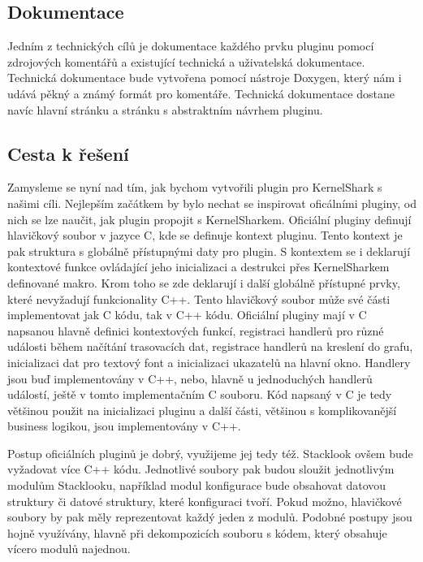 \subsection*{Dokumentace}

Jedním z technických cílů je dokumentace každého prvku pluginu pomocí zdrojových komentářů a existující technická a uživatelská dokumentace. Technická dokumentace bude vytvořena pomocí nástroje Doxygen, který nám i udává pěkný a známý formát pro komentáře. Technická dokumentace dostane navíc hlavní stránku a stránku s abstraktním návrhem pluginu.

\subsection*{Cesta k řešení}

Zamysleme se nyní nad tím, jak bychom vytvořili plugin pro KernelShark s našimi cíli. Nejlepším začátkem by bylo nechat se inspirovat oficálními pluginy, od nich se lze naučit, jak plugin propojit s KernelSharkem. Oficiální pluginy definují hlavičkový soubor v jazyce C, kde se definuje kontext pluginu. Tento kontext je pak struktura s globálně přístupnými daty pro plugin. S kontextem se i deklarují kontextové funkce ovládající jeho inicializaci a destrukci přes KernelSharkem definované makro. Krom toho se zde deklarují i další globálně přístupné prvky, které nevyžadují funkcionality C++. Tento hlavičkový soubor může své části implementovat jak C kódu, tak v C++ kódu. Oficiální pluginy mají v C napsanou hlavně definici kontextových funkcí, registraci handlerů pro různé události během načítání trasovacích dat, registrace handlerů na kreslení do grafu, inicializaci dat pro textový font a inicializaci ukazatelů na hlavní okno. Handlery jsou buď implementovány v C++, nebo, hlavně u jednoduchých handlerů událostí, ještě v tomto implementačním C souboru. Kód napsaný v C je tedy většinou použit na inicializaci pluginu a další části, většinou s komplikovanější business logikou, jsou implementovány v C++.

Postup oficiálních pluginů je dobrý, využijeme jej tedy též. Stacklook ovšem bude vyžadovat více C++ kódu. Jednotlivé soubory pak budou sloužit jednotlivým modulům Stacklooku, například modul konfigurace bude obsahovat datovou struktury či datové struktury, které konfiguraci tvoří. Pokud možno, hlavičkové soubory by pak měly reprezentovat každý jeden z modulů. Podobné postupy jsou hojně využívány, hlavně při dekompozicích souboru s kódem, který obsahuje vícero modulů najednou.

